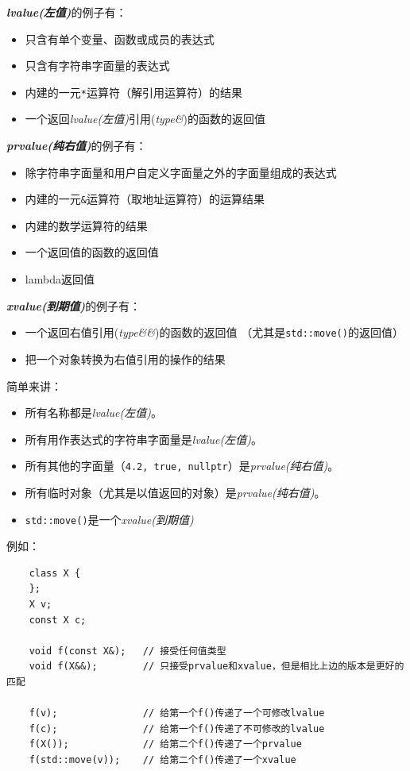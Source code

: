 \emph{\textbf{lvalue(左值)}}的例子有：
\begin{itemize}[leftmargin=*]
    \item 只含有单个变量、函数或成员的表达式
    \item 只含有字符串字面量的表达式
    \item 内建的一元\texttt{*}运算符（解引用运算符）的结果
    \item 一个返回\emph{lvalue(左值)}引用(\emph{type\&})的函数的返回值
\end{itemize}
\emph{\textbf{prvalue(纯右值)}}的例子有：
\begin{itemize}[leftmargin=*]
    \item 除字符串字面量和用户自定义字面量之外的字面量组成的表达式
    \item 内建的一元\texttt{\&}运算符（取地址运算符）的运算结果
    \item 内建的数学运算符的结果
    \item 一个返回值的函数的返回值
    \item lambda返回值
\end{itemize}
\emph{\textbf{xvalue(到期值)}}的例子有：
\begin{itemize}[leftmargin=*]
    \item 一个返回右值引用(\emph{type\&\&})的函数的返回值
    （尤其是\texttt{std::move()}的返回值）
    \item 把一个对象转换为右值引用的操作的结果
\end{itemize}
简单来讲：
\begin{itemize}[leftmargin=*]
    \item 所有名称都是\emph{lvalue(左值)}。
    \item 所有用作表达式的字符串字面量是\emph{lvalue(左值)}。
    \item 所有其他的字面量（\texttt{4.2, true, nullptr}）是\emph{prvalue(纯右值)}。
    \item 所有临时对象（尤其是以值返回的对象）是\emph{prvalue(纯右值)}。
    \item \texttt{std::move()}是一个\emph{xvalue(到期值)}
\end{itemize}
例如：
\begin{lstlisting}
    class X {
    };
    X v;
    const X c;

    void f(const X&);   // 接受任何值类型
    void f(X&&);        // 只接受prvalue和xvalue，但是相比上边的版本是更好的匹配

    f(v);               // 给第一个f()传递了一个可修改lvalue
    f(c);               // 给第一个f()传递了不可修改的lvalue
    f(X());             // 给第二个f()传递了一个prvalue
    f(std::move(v));    // 给第二个f()传递了一个xvalue
\end{lstlisting}
